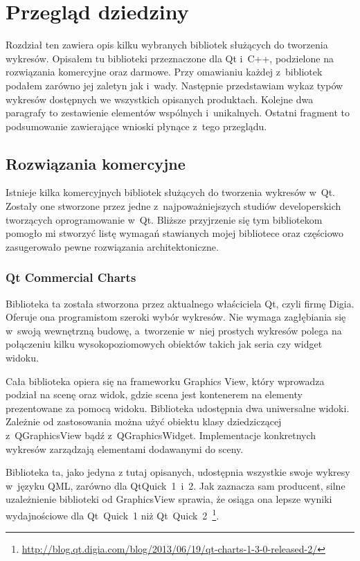 \chapter{Przegląd dziedziny}
Rozdział ten zawiera opis kilku wybranych bibliotek służących do tworzenia wykresów. Opisałem tu  biblioteki przeznaczone dla Qt i~C++, podzielone na rozwiązania komercyjne oraz darmowe. Przy omawianiu każdej z~bibliotek podałem zarówno jej zaletyn jak i~wady. Następnie przedstawiam wykaz typów wykresów dostępnych we wszystkich opisanych produktach. Kolejne dwa paragrafy to zestawienie elementów wspólnych i~unikalnych. Ostatni fragment to podsumowanie zawierające wnioski płynące z~tego przeglądu.

\section{Rozwiązania komercyjne}
Istnieje kilka komercyjnych bibliotek służących do tworzenia wykresów w~Qt. Zostały one stworzone przez jedne z~najpoważniejszych studiów developerskich tworzących oprogramowanie w~Qt. Bliższe przyjrzenie się tym bibliotekom pomogło mi stworzyć listę wymagań stawianych mojej bibliotece oraz częściowo zasugerowało pewne rozwiązania architektoniczne.
 
\subsection{Qt Commercial Charts}
Biblioteka ta została stworzona przez aktualnego właściciela Qt, czyli firmę Digia. Oferuje ona programistom szeroki wybór wykresów. Nie wymaga zagłębiania się w~swoją wewnętrzną budowę, a~tworzenie w~niej prostych wykresów polega na połączeniu kilku wysokopoziomowych obiektów takich jak seria czy widget widoku.\newline

Cała biblioteka opiera się na frameworku Graphics View, który wprowadza podział na scenę oraz widok, gdzie scena jest kontenerem na elementy prezentowane za pomocą widoku.
Biblioteka udostępnia dwa uniwersalne widoki. Zależnie od zastosowania można użyć obiektu klasy dziedziczącej z~QGraphicsView bądź z~QGraphicsWidget. Implementacje konkretnych wykresów zarządzają elementami dodawanymi do sceny.\newline

Biblioteka ta, jako jedyna z tutaj opisanych, udostępnia wszystkie swoje wykresy w~języku QML, zarówno dla QtQuick~1~i~2.
Jak zaznacza sam producent, silne uzależnienie biblioteki od GraphicsView sprawia, że osiąga ona lepsze wyniki wydajnościowe dla Qt~Quick~1 niż Qt~Quick~2~\footnote{\url{http://blog.qt.digia.com/blog/2013/06/19/qt-charts-1-3-0-released-2/}}.\newline

